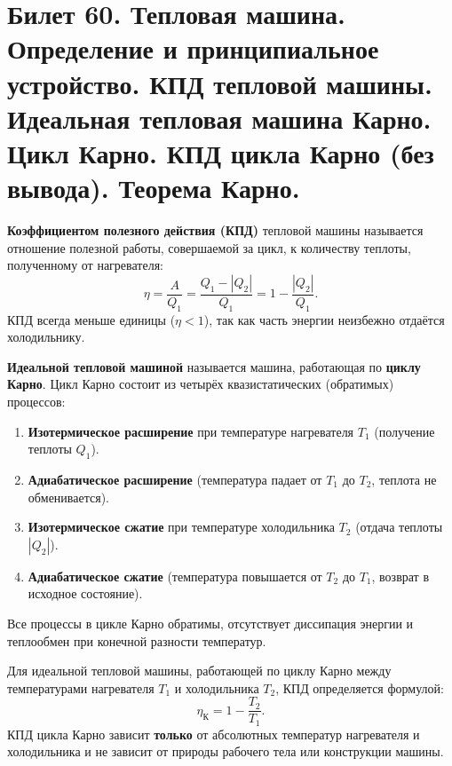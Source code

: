 \section{Билет 60. Тепловая машина. Определение и принципиальное устройство. КПД тепловой машины. Идеальная тепловая машина Карно. Цикл Карно. КПД цикла Карно (без вывода). Теорема Карно.}

\begin{definition}
\textbf{Коэффициентом полезного действия (КПД)} тепловой машины называется отношение полезной работы, совершаемой за цикл, к количеству теплоты, полученному от нагревателя:
\begin{equation}
    \eta = \frac{A}{Q_1} = \frac{Q_1 - |Q_2|}{Q_1} = 1 - \frac{|Q_2|}{Q_1}. \label{eq:efficiency_60}
\end{equation}
КПД всегда меньше единицы ($\eta < 1$), так как часть энергии неизбежно отдаётся холодильнику.
\end{definition}

\begin{definition}
\textbf{Идеальной тепловой машиной} называется машина, работающая по \textbf{циклу Карно}. Цикл Карно состоит из четырёх квазистатических (обратимых) процессов:
\begin{enumerate}
    \item \textbf{Изотермическое расширение} при температуре нагревателя $T_1$ (получение теплоты $Q_1$).
    \item \textbf{Адиабатическое расширение} (температура падает от $T_1$ до $T_2$, теплота не обменивается).
    \item \textbf{Изотермическое сжатие} при температуре холодильника $T_2$ (отдача теплоты $|Q_2|$).
    \item \textbf{Адиабатическое сжатие} (температура повышается от $T_2$ до $T_1$, возврат в исходное состояние).
\end{enumerate}
Все процессы в цикле Карно обратимы, отсутствует диссипация энергии и теплообмен при конечной разности температур.
\end{definition}

\begin{theorem}
Для идеальной тепловой машины, работающей по циклу Карно между температурами нагревателя $T_1$ и холодильника $T_2$, КПД определяется формулой:
\begin{equation}
    \eta_{\text{К}} = 1 - \frac{T_2}{T_1}. \label{eq:carnot_eff_60}
\end{equation}
КПД цикла Карно зависит \textbf{только} от абсолютных температур нагревателя и холодильника и не зависит от природы рабочего тела или конструкции машины.
\end{theorem}

